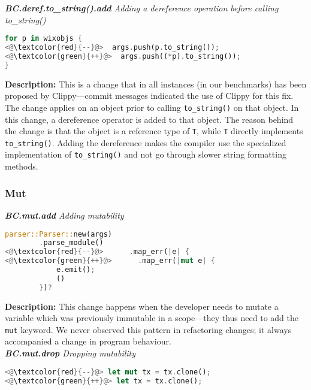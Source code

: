 \noindent\textit{\textbf{BC.deref.to\_string().add} Adding a dereference operation before calling to\_string()}

\begin{lstlisting}[language=Rust, style=colouredRust]
for p in wixobjs {
<@\textcolor{red}{--}@>  args.push(p.to_string());
<@\textcolor{green}{++}@>  args.push((*p).to_string());
}

\end{lstlisting}

\noindent\textbf{Description:} This is a change that in all instances (in our benchmarks) has been proposed by Clippy---commit messages indicated the use of Clippy for this fix. The change applies on an object prior to calling \verb+to_string()+ on that object. In this change, a dereference operator is added to that object. The reason behind the change is that the object is a reference type of \verb+T+, while \verb+T+ directly implements \verb+to_string()+. Adding the dereference makes the compiler use the specialized implementation of \verb+to_string()+ and not go through slower string formatting methods.


\subsubsection{Mut}

\noindent\textit{\textbf{BC.mut.add} Adding mutability}

\begin{lstlisting}[language=Rust, style=colouredRust]
parser::Parser::new(args)
        .parse_module()
<@\textcolor{red}{--}@>      .map_err(|e| {
<@\textcolor{green}{++}@>      .map_err(|mut e| {
            e.emit();
            ()
        })?
\end{lstlisting}

\noindent\textbf{Description:} This change happens when the developer needs to mutate a variable which was previously immutable in a scope---they thus need to add the \verb+mut+ keyword. We never observed this pattern in refactoring changes; it always accompanied a change in program behaviour. \\

\noindent\textit{\textbf{BC.mut.drop} Dropping mutability}

\begin{lstlisting}[language=Rust, style=colouredRust]
<@\textcolor{red}{--}@> let mut tx = tx.clone();
<@\textcolor{green}{++}@> let tx = tx.clone();
\end{lstlisting}

